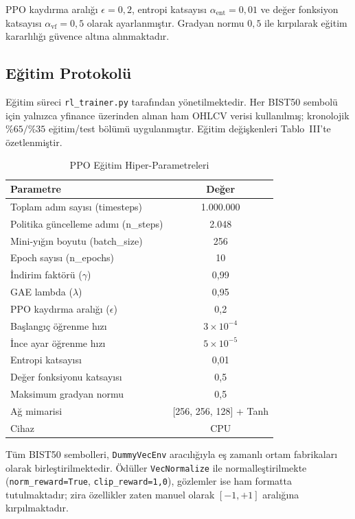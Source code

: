 \documentclass[journal]{IEEEtran}
\begin{document}
PPO kaydırma aralığı $\epsilon = 0{,}2$, entropi katsayısı
$\alpha_{\text{ent}} = 0{,}01$ ve değer fonksiyon katsayısı
$\alpha_{\text{vf}} = 0{,}5$ olarak ayarlanmıştır. Gradyan normu
$0{,}5$ ile kırpılarak eğitim kararlılığı güvence altına alınmaktadır.

\subsection{Eğitim Protokolü}

Eğitim süreci \texttt{rl\_trainer.py} tarafından yönetilmektedir.
Her BIST50 sembolü için yalnızca yfinance üzerinden alınan ham OHLCV
verisi kullanılmış; kronolojik $\%65/\%35$ eğitim/test bölümü
uygulanmıştır. Eğitim değişkenleri Tablo~III'te özetlenmiştir.

\begin{table}[ht]
\caption{PPO Eğitim Hiper-Parametreleri}
\label{tab:hparams}
\centering
\renewcommand{\arraystretch}{1.15}
\begin{tabular}{lc}
\toprule
\textbf{Parametre} & \textbf{Değer} \\
\midrule
Toplam adım sayısı (timesteps)      & 1.000.000 \\
Politika güncelleme adımı (n\_steps) & 2.048 \\
Mini-yığın boyutu (batch\_size)      & 256 \\
Epoch sayısı (n\_epochs)             & 10 \\
İndirim faktörü ($\gamma$)           & 0,99 \\
GAE lambda ($\lambda$)               & 0,95 \\
PPO kaydırma aralığı ($\epsilon$)    & 0,2 \\
Başlangıç öğrenme hızı              & $3 \times 10^{-4}$ \\
İnce ayar öğrenme hızı              & $5 \times 10^{-5}$ \\
Entropi katsayısı                   & 0,01 \\
Değer fonksiyonu katsayısı          & 0,5 \\
Maksimum gradyan normu              & 0,5 \\
Ağ mimarisi                         & [256, 256, 128] + Tanh \\
Cihaz                               & CPU \\
\bottomrule
\end{tabular}
\end{table}

Tüm BIST50 sembolleri, \texttt{DummyVecEnv} aracılığıyla eş zamanlı
ortam fabrikaları olarak birleştirilmektedir. Ödüller
\texttt{VecNormalize} ile normalleştirilmekte
(\texttt{norm\_reward=True}, \texttt{clip\_reward=1{,}0}), gözlemler
ise ham formatta tutulmaktadır; zira özellikler zaten manuel olarak
$[-1,+1]$ aralığına kırpılmaktadır.
\end{document}

